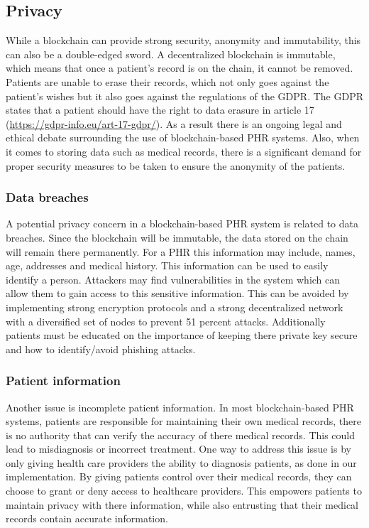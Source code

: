 \documentclass{article}
\begin{document}
\subsection{Privacy}
While a blockchain can provide strong security, anonymity and immutability, this can also be a double-edged sword. A decentralized blockchain is immutable, which means that once a patient's record is on the chain, it cannot be removed. Patients are unable to erase their records, which  not only goes against the patient's wishes but it also goes against the regulations of the GDPR. The GDPR states that a patient should have the right to data erasure in article 17 (\url{https://gdpr-info.eu/art-17-gdpr/}). As a result there is an ongoing legal and ethical debate surrounding the use of blockchain-based PHR systems. Also, when it comes to storing data such as medical records, there is a significant demand for proper security measures to be taken to ensure the anonymity of the patients.

\subsubsection{Data breaches}
A potential privacy concern in a blockchain-based PHR system is related to data breaches. Since the blockchain will be immutable, the data stored on the chain will remain there permanently. For a PHR this information may include, names, age, addresses and medical history. This information can be used to easily identify a person. Attackers may find vulnerabilities in the system which can allow them to gain access to this sensitive information. This can be avoided by implementing strong encryption protocols and a strong decentralized network with a diversified set of nodes to prevent 51 percent attacks. Additionally patients must be educated on the importance of keeping there private key secure and how to identify/avoid phishing attacks.

\subsubsection{Patient information}
Another issue is incomplete patient information. In most blockchain-based PHR systems, patients are responsible for maintaining their own medical records, there is no authority that can verify the accuracy of there medical records. This could lead to misdiagnosis or incorrect treatment. One way to address this issue is by only giving health care providers the ability to diagnosis patients, as done in our implementation. By giving patients control over their medical records, they can choose to grant or deny access to healthcare providers. This empowers patients to maintain privacy with there information, while also entrusting that their medical records contain accurate information.
\end{document}
